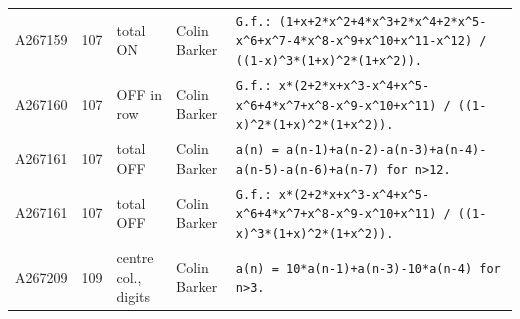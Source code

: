\documentclass[11pt]{article}
\theoremstyle{definition}
\theoremstyle{remark}
\begin{document}
{\begin{longtable}{p{1.3cm}p{0.7cm}p{2.4cm}p{2.3cm}p{7.3cm}}
A267159 & 107 & total ON & Colin Barker & \texttt{G.f.: \allowbreak{}(1+\allowbreak{}x+\allowbreak{}2*\allowbreak{}x\^{}2+\allowbreak{}4*\allowbreak{}x\^{}3+\allowbreak{}2*\allowbreak{}x\^{}4+\allowbreak{}2*\allowbreak{}x\^{}5-\allowbreak{}x\^{}6+\allowbreak{}x\^{}7-\allowbreak{}4*\allowbreak{}x\^{}8-\allowbreak{}x\^{}9+\allowbreak{}x\^{}10+\allowbreak{}x\^{}11-\allowbreak{}x\^{}12)\allowbreak{} \allowbreak{}/\allowbreak{} \allowbreak{}((1-\allowbreak{}x)\allowbreak{}\^{}3*\allowbreak{}(1+\allowbreak{}x)\allowbreak{}\^{}2*\allowbreak{}(1+\allowbreak{}x\^{}2)\allowbreak{})\allowbreak{}.} \\
A267160 & 107 & OFF in row & Colin Barker & \texttt{G.f.: \allowbreak{}x*\allowbreak{}(2+\allowbreak{}2*\allowbreak{}x+\allowbreak{}x\^{}3-\allowbreak{}x\^{}4+\allowbreak{}x\^{}5-\allowbreak{}x\^{}6+\allowbreak{}4*\allowbreak{}x\^{}7+\allowbreak{}x\^{}8-\allowbreak{}x\^{}9-\allowbreak{}x\^{}10+\allowbreak{}x\^{}11)\allowbreak{} \allowbreak{}/\allowbreak{} \allowbreak{}((1-\allowbreak{}x)\allowbreak{}\^{}2*\allowbreak{}(1+\allowbreak{}x)\allowbreak{}\^{}2*\allowbreak{}(1+\allowbreak{}x\^{}2)\allowbreak{})\allowbreak{}.} \\
A267161 & 107 & total OFF & Colin Barker & \texttt{a(n)\allowbreak{} \allowbreak{}=\allowbreak{} \allowbreak{}a(n-\allowbreak{}1)\allowbreak{}+\allowbreak{}a(n-\allowbreak{}2)\allowbreak{}-\allowbreak{}a(n-\allowbreak{}3)\allowbreak{}+\allowbreak{}a(n-\allowbreak{}4)\allowbreak{}-\allowbreak{}a(n-\allowbreak{}5)\allowbreak{}-\allowbreak{}a(n-\allowbreak{}6)\allowbreak{}+\allowbreak{}a(n-\allowbreak{}7)\allowbreak{} \allowbreak{}for \allowbreak{}n>12.} \\
A267161 & 107 & total OFF & Colin Barker & \texttt{G.f.: \allowbreak{}x*\allowbreak{}(2+\allowbreak{}2*\allowbreak{}x+\allowbreak{}x\^{}3-\allowbreak{}x\^{}4+\allowbreak{}x\^{}5-\allowbreak{}x\^{}6+\allowbreak{}4*\allowbreak{}x\^{}7+\allowbreak{}x\^{}8-\allowbreak{}x\^{}9-\allowbreak{}x\^{}10+\allowbreak{}x\^{}11)\allowbreak{} \allowbreak{}/\allowbreak{} \allowbreak{}((1-\allowbreak{}x)\allowbreak{}\^{}3*\allowbreak{}(1+\allowbreak{}x)\allowbreak{}\^{}2*\allowbreak{}(1+\allowbreak{}x\^{}2)\allowbreak{})\allowbreak{}.} \\
A267209 & 109 & centre col., digits & Colin Barker & \texttt{a(n)\allowbreak{} \allowbreak{}=\allowbreak{} \allowbreak{}10*\allowbreak{}a(n-\allowbreak{}1)\allowbreak{}+\allowbreak{}a(n-\allowbreak{}3)\allowbreak{}-\allowbreak{}10*\allowbreak{}a(n-\allowbreak{}4)\allowbreak{} \allowbreak{}for \allowbreak{}n>3.} \\

\end{longtable}}
\end{document}
